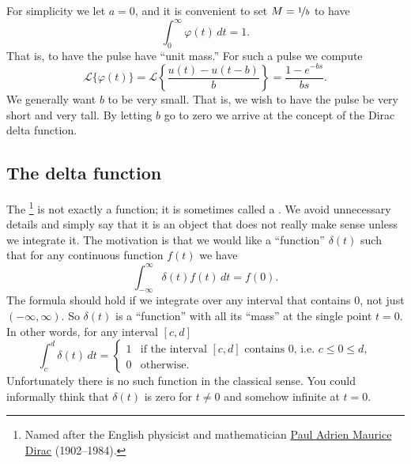 \documentclass{ximera}
\begin{document}
For simplicity we let $a=0$, and it is convenient to set $M = \nicefrac{1}{b}$ to have
\begin{equation*}
    \int_0^\infty \varphi(t) \,dt = 1 .
\end{equation*}
That is, to have the pulse have ``unit mass.'' For such a pulse we compute
\begin{equation*}
    {\mathcal{L}} \bigl\{ \varphi(t) \bigr\} = {\mathcal{L}} \left\{ \frac{u(t) - u(t-b)}{b}  \right\} = \frac{1 - e^{-bs}}{bs} .
\end{equation*}
We generally want $b$ to be very small.  That is, we wish to have the pulse be very short and very tall.  By letting $b$ go to zero we arrive at the concept of the Dirac delta function.

\subsection{The delta function}

The \emph{}%
\footnote{Named after the English physicist and mathematician \href{https://en.wikipedia.org/wiki/Paul_Dirac}{Paul Adrien Maurice Dirac} (1902--1984).}
is not exactly a function; it is sometimes called a \emph{}.  We avoid unnecessary details and simply say that it is an object that does not really make sense unless we integrate it.  The motivation is that we would like a ``function'' $\delta(t)$ such that for any continuous function $f(t)$ we have
\begin{equation*}
    \int_{-\infty}^\infty \delta(t) f(t) \,dt = f(0) .
\end{equation*}
The formula should hold if we integrate over any interval that contains 0, not just $(-\infty,\infty)$. So $\delta(t)$ is a ``function''  with all its ``mass'' at the single point $t=0$.  In other words, for any interval $[c,d]$
\begin{equation*}
    \int_c^d \delta(t) \,dt = 
    \begin{cases}
        1 & \text{if the interval $[c,d]$ contains 0, i.e.\ } c \leq 0 \leq d, \\
        0 & \text{otherwise.}
    \end{cases}
\end{equation*}
Unfortunately there is no such function in the classical sense.  You could informally think that $\delta(t)$ is zero for $t\not=0$ and somehow infinite at $t=0$.
\end{document}
